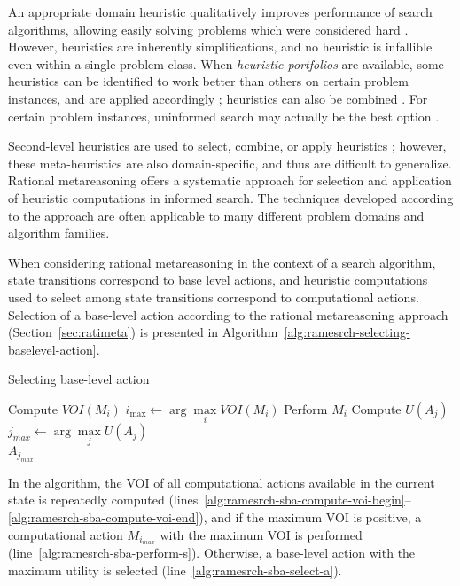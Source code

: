 An appropriate domain heuristic qualitatively improves performance of
search algorithms, allowing easily solving problems which were
considered hard \cite{Allen.selheur}. However, heuristics are
inherently simplifications, and no heuristic is infallible even within
a single problem class. When {\em heuristic portfolios} are available,
some heuristics can be identified to work better than others on
certain problem instances, and are applied accordingly
\cite{Allen.selheur}; heuristics can also be combined
\cite{Domshlak.maxornot}. For certain problem instances, uninformed
search may actually be the best option \cite{Kask.solcount}.

Second-level heuristics are used to select, combine, or apply
heuristics \cite{Allen.selheur,Bulitko.dynamiccontrol}; however,
these meta-heuristics are also domain-specific, and thus are difficult
to generalize. Rational metareasoning offers a systematic approach for
selection and application of heuristic computations in informed search. The
techniques developed according to the approach are often applicable to
many different problem domains and algorithm families.

When considering rational metareasoning in the context of a search
algorithm, state transitions correspond to base level actions, and
heuristic computations used to select among state transitions
correspond to computational actions. Selection of a base-level action
according to the rational metareasoning approach
(Section~\ref{sec:ratimeta}) is presented in
Algorithm~\ref{alg:ramesrch-selecting-baselevel-action}.
\begin{algorithm}
  \caption{Selecting base-level action}
  \label{alg:ramesrch-selecting-baselevel-action}
  \begin{algorithmic}[1]
    \Loop                                    \label{alg:ramesrch-sba-compute-voi-begin}
        \State Compute $VOI(M_i)$            \label{alg:ramesrch-sba-compute-voi}
      \EndFor
      \State $i_{\max} \leftarrow \arg \max\limits_i VOI(M_i)$
         \State Perform $M_i$                \label{alg:ramesrch-sba-perform-s}
      \Else
      \EndIf
    \EndLoop                                 \label{alg:ramesrch-sba-compute-voi-end}
       \State Compute $U(A_j)$
    \EndFor
    \State $j_{max} \leftarrow \arg \max \limits_j U(A_j)$
    \\ \Return $A_{j_{max}}$              \label{alg:ramesrch-sba-select-a}
  \end{algorithmic}
\end{algorithm}
In the algorithm, the VOI of all computational actions available in
the current state is repeatedly computed
(lines~\ref{alg:ramesrch-sba-compute-voi-begin}--\ref{alg:ramesrch-sba-compute-voi-end}),
and if the maximum VOI is positive, a computational action
$M_{i_{max}}$ with the maximum VOI is performed
(line~\ref{alg:ramesrch-sba-perform-s}). Otherwise, a base-level
action with the maximum utility is selected
(line~\ref{alg:ramesrch-sba-select-a}).

